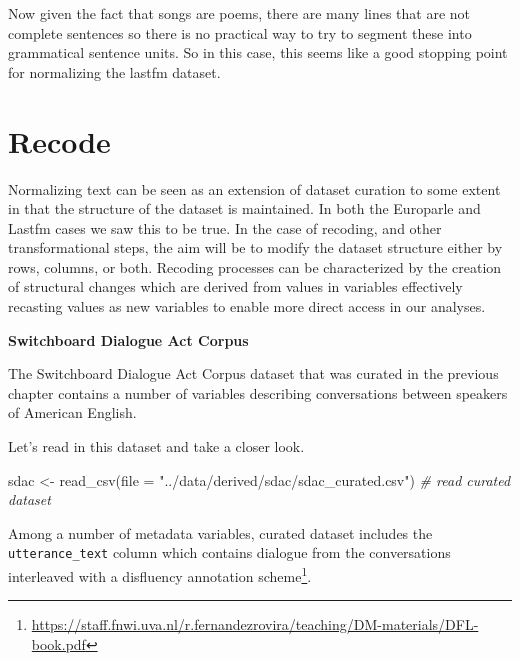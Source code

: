 \documentclass[
  letterpaper,
]{scrbook}
\newenvironment{Shaded}{\begin{snugshade}}{\end{snugshade}}
\newcommand{\AttributeTok}[1]{\textcolor[rgb]{0.00,0.00,0.00}{#1}}
\newcommand{\CommentTok}[1]{\textcolor[rgb]{0.00,0.00,0.00}{\textit{#1}}}
\newcommand{\FunctionTok}[1]{\textcolor[rgb]{0.00,0.00,0.00}{#1}}
\newcommand{\NormalTok}[1]{\textcolor[rgb]{0.00,0.00,0.00}{#1}}
\newcommand{\OtherTok}[1]{\textcolor[rgb]{0.00,0.00,0.00}{#1}}
\newcommand{\StringTok}[1]{\textcolor[rgb]{0.00,0.00,0.00}{#1}}
\DeclareRobustCommand{\href}[2]{#2\footnote{\url{#1}}}
\begin{document}
Now given the fact that songs are poems, there are many lines that are
not complete sentences so there is no practical way to try to segment
these into grammatical sentence units. So in this case, this seems like
a good stopping point for normalizing the lastfm dataset.

\hypertarget{td-recode}{%
\section{Recode}\label{td-recode}}

Normalizing text can be seen as an extension of dataset curation to some
extent in that the structure of the dataset is maintained. In both the
Europarle and Lastfm cases we saw this to be true. In the case of
recoding, and other transformational steps, the aim will be to modify
the dataset structure either by rows, columns, or both. Recoding
processes can be characterized by the creation of structural changes
which are derived from values in variables effectively recasting values
as new variables to enable more direct access in our analyses.

\textbf{Switchboard Dialogue Act Corpus}

The Switchboard Dialogue Act Corpus dataset that was curated in the
previous chapter contains a number of variables describing conversations
between speakers of American English.

Let's read in this dataset and take a closer look.

\begin{Shaded}
\begin{Highlighting}[]
\NormalTok{sdac }\OtherTok{\textless{}{-}} \FunctionTok{read\_csv}\NormalTok{(}\AttributeTok{file =} \StringTok{"../data/derived/sdac/sdac\_curated.csv"}\NormalTok{) }\CommentTok{\# read curated dataset}
\end{Highlighting}
\end{Shaded}

Among a number of metadata variables, curated dataset includes the
\texttt{utterance\_text} column which contains dialogue from the
conversations interleaved with a
\href{https://staff.fnwi.uva.nl/r.fernandezrovira/teaching/DM-materials/DFL-book.pdf}{disfluency
annotation scheme}.
\end{document}
